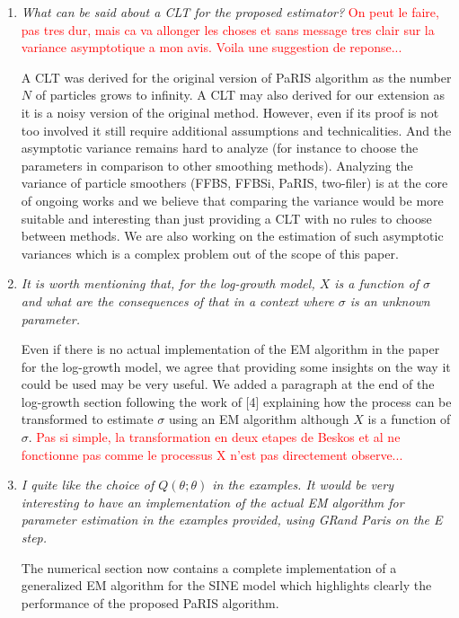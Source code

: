 \documentclass[12pt]{article}
\newcommand{\1}{\mathrm{1}}
\begin{document}
\begin{enumerate}
\item {\em What can be said about a CLT for the proposed estimator?}
\textcolor{red}{On peut le faire, pas tres dur, mais ca va allonger les choses et sans message tres clair sur la variance asymptotique a mon avis. Voila une suggestion de reponse...}

\vspace{.3cm}

A CLT was derived for the original version of PaRIS algorithm as the number $N$ of particles grows to infinity. A CLT may also derived for our extension as it is a noisy version of the original method. However, even if its proof is not too involved it still require additional assumptions and technicalities. And the asymptotic variance remains hard to analyze (for instance to choose the parameters in comparison to other smoothing methods). Analyzing the variance of particle smoothers (FFBS, FFBSi, PaRIS, two-filer) is at the core of ongoing works and we believe that comparing the variance would be more suitable and interesting than just providing a CLT with no rules to choose between methods. We are also working on the estimation of such asymptotic variances which is a complex problem out of the scope of this paper.

\item {\em It is worth mentioning that, for the log-growth model, $X$ is a function of $\sigma$ and what
are the consequences of that in a context where $\sigma$ is an unknown parameter.}

\vspace{.3cm}

Even if there is no actual implementation of the EM algorithm in the paper for the log-growth model, we agree that providing some insights on the way it could be used may be very useful. We added a paragraph at the end of the log-growth section following the work of [4] explaining how the process can be transformed to estimate $\sigma$ using an EM algorithm although $X$ is a function of $\sigma$. \textcolor{red}{Pas si simple, la transformation en deux etapes de Beskos et al ne fonctionne pas comme le processus X n'est pas directement observe...}

\item {\em I quite like the choice of $Q(\theta;\theta)$ in the examples. It would be very interesting to
have an implementation of the actual EM algorithm for parameter estimation in the
examples provided, using GRand Paris on the E step.}

\vspace{.3cm}

The numerical section now contains a complete implementation of a generalized EM algorithm for the SINE model which highlights clearly the performance of the proposed PaRIS algorithm.  
\end{enumerate}
\end{document}
